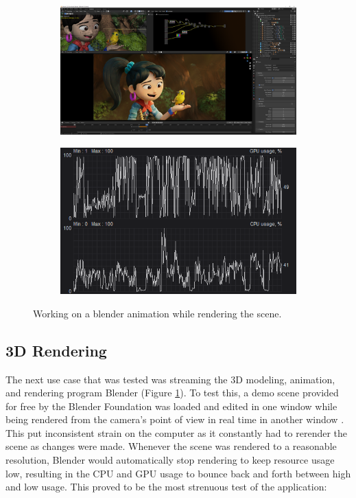 \begin{figure}[t]
  \centering
  \begin{subfigure}{1\textwidth}
    \centering
    \includegraphics[width=.9\linewidth]{Figures/realworld/blender}
  \end{subfigure}
  \begin{subfigure}{1\textwidth}
    \centering
    \includegraphics[width=.5\linewidth]{Figures/realworld/blenderstats}
  \end{subfigure}
  \caption[Streaming a 3D modeling, animation, and rendering program]{Working on a blender animation while rendering the scene.}
  \label{fig:RealWorldBlender}
\end{figure}

\subsection{3D Rendering}\label{subsec:RealWorldBlender}

The next use case that was tested was streaming the 3D modeling, animation, and rendering program Blender (Figure \ref{fig:RealWorldBlender}).
To test this, a demo scene provided for free by the Blender Foundation was loaded and edited in one window while being rendered from the camera's point of view in real time in another window \cite{BlenderDemoScene}.
This put inconsistent strain on the computer as it constantly had to rerender the scene as changes were made.
Whenever the scene was rendered to a reasonable resolution, Blender would automatically stop rendering to keep resource usage low, resulting in the CPU and GPU usage to bounce back and forth between high and low usage.
This proved to be the most strenuous test of the application:

